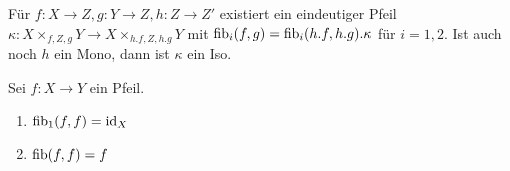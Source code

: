 \begin{prop}
Für $f: X\to Z, g:Y\to Z, h:Z\to Z'$ existiert ein eindeutiger Pfeil $\kappa : X\times_{f,Z,g} Y \to X\times_{h.f,Z,h.g} Y$ mit $\operatorname{fib}_i(f,g) = \operatorname{fib}_i(h.f,h.g).\kappa$ für $i=1,2$. Ist auch noch $h$ ein Mono, dann ist $\kappa$ ein Iso.
\end{prop}

\begin{prop} \label{more-fib-calculations}
Sei $f : X \to Y$ ein Pfeil.

\begin{enumerate}
\item $\operatorname{fib}_1(f,f) = \operatorname{id}_X$
\item $\operatorname{fib}(f,f) = f$
\end{enumerate}
\end{prop}
